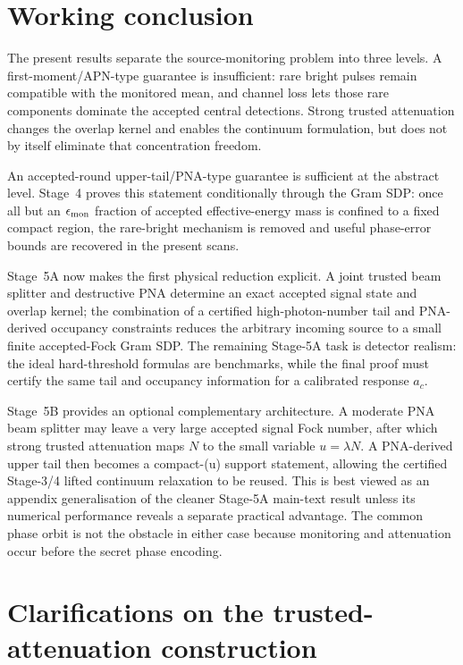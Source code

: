 \documentclass[11pt]{article}
\theoremstyle{remark}
\begin{document}
\section{Working conclusion}

The present results separate the source-monitoring problem into three levels.
A first-moment/APN-type guarantee is insufficient: rare bright pulses remain
compatible with the monitored mean, and channel loss lets those rare
components dominate the accepted central detections.  Strong trusted
attenuation changes the overlap kernel and enables the continuum formulation,
but does not by itself eliminate that concentration freedom.

An accepted-round upper-tail/PNA-type guarantee is sufficient at the abstract
level.  Stage~4 proves this statement conditionally through the Gram SDP:
once all but an \(\epsilon_{\rm mon}\) fraction of accepted effective-energy
mass is confined to a fixed compact region, the rare-bright mechanism is
removed and useful phase-error bounds are recovered in the present scans.

Stage~5A now makes the first physical reduction explicit.  A joint trusted
beam splitter and destructive PNA determine an exact accepted signal state and
overlap kernel; the combination of a certified high-photon-number tail and
PNA-derived occupancy constraints reduces the arbitrary incoming source to a
small finite accepted-Fock Gram SDP.  The remaining Stage-5A task is detector
realism: the ideal hard-threshold formulas are benchmarks, while the final
proof must certify the same tail and occupancy information for a calibrated
response \(a_c\).

Stage~5B provides an optional complementary architecture.  A moderate PNA
beam splitter may leave a very large accepted signal Fock number, after which
strong trusted attenuation maps \(N\) to the small variable
\(u=\lambda N\).  A PNA-derived upper tail then becomes a compact-(u)
support statement, allowing the certified Stage-3/4 lifted continuum
relaxation to be reused.  This is best viewed as an appendix generalisation of
the cleaner Stage-5A main-text result unless its numerical performance reveals
a separate practical advantage.  The common phase orbit is not the obstacle
in either case because monitoring and attenuation occur before the secret
phase encoding.

\appendix

\section{Clarifications on the trusted-attenuation construction}
\label{app:trusted-attenuation-clarifications}
\end{document}
